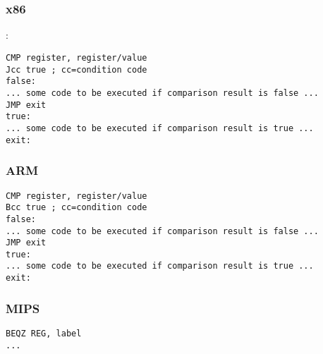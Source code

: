 \chapter{}
\label{sec:Jcc}






\section{\Conclusion{}}

\subsection{x86}

:

\begin{lstlisting}[caption=x86]
CMP register, register/value
Jcc true ; cc=condition code
false:
... some code to be executed if comparison result is false ...
JMP exit 
true:
... some code to be executed if comparison result is true ...
exit:
\end{lstlisting}

\ifdefined\IncludeARM

\subsection{ARM}

\begin{lstlisting}[caption=ARM]
CMP register, register/value
Bcc true ; cc=condition code
false:
... some code to be executed if comparison result is false ...
JMP exit 
true:
... some code to be executed if comparison result is true ...
exit:
\end{lstlisting}
\fi

\ifdefined\IncludeMIPS

\subsection{MIPS}

\begin{lstlisting}[caption=\RU{Проверка на ноль}\EN{Check for zero}]
BEQZ REG, label
...
\end{lstlisting}

